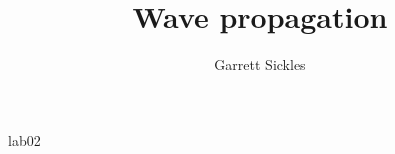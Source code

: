 
\def\thisdoc{lab02}
\def\exedirs{sigsbee,viking}

\author{Garrett Sickles}
\title{Wave propagation}{\thisdoc}

%



%

\tiny
\clearpage

\clearpage

\normalsize
